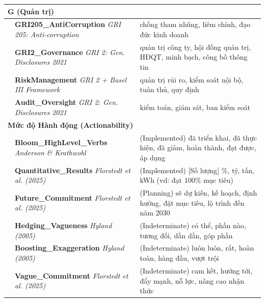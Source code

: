 \begin{longtable}{|p{2cm}|p{5cm}|p{7cm}|}
\multicolumn{3}{|l|}{\textbf{G (Quản trị)}} \\
\hline
\multirow{1}{*}{} & \textbf{GRI205\_AntiCorruption} \newline \textit{GRI 205: Anti-corruption} & chống tham nhũng, liêm chính, đạo đức kinh doanh \\
\hline
\multirow{1}{*}{} & \textbf{GRI2\_Governance} \newline \textit{GRI 2: Gen. Disclosures 2021} & quản trị công ty, hội đồng quản trị, HĐQT, minh bạch, công bố thông tin \\
\hline
\multirow{1}{*}{} & \textbf{RiskManagement} \newline \textit{GRI 2 + Basel III Framework} & quản trị rủi ro, kiểm soát nội bộ, tuân thủ, quy định \\
\hline
\multirow{1}{*}{} & \textbf{Audit\_Oversight} \newline \textit{GRI 2: Gen. Disclosures 2021} & kiểm toán, giám sát, ban kiểm soát \\
\hline

\multicolumn{3}{|l|}{\textbf{Mức độ Hành động (Actionability)}} \\
\hline
\multirow{1}{*}{} & \textbf{Bloom\_HighLevel\_Verbs} \newline \textit{Anderson \& Krathwohl \cite{anderson2001taxonomy}} & (Implemented) đã triển khai, đã thực hiện, đã giảm, hoàn thành, đạt được, áp dụng \\
\hline
\multirow{1}{*}{} & \textbf{Quantitative\_Results} \newline \textit{Florstedt et al. (2025) \cite{florstedt2025detecting}} & (Implemented) [Số lượng] \%, tỷ, tấn, kWh (vd: đạt 100\% mục tiêu) \\
\hline
\multirow{1}{*}{} & \textbf{Future\_Commitment} \newline \textit{Florstedt et al. (2025) \cite{florstedt2025detecting}} & (Planning) sẽ dự kiến, kế hoạch, định hướng, đặt mục tiêu, lộ trình đến năm 2030 \\
\hline
\multirow{1}{*}{} & \textbf{Hedging\_Vagueness} \newline \textit{Hyland (2005) \cite{rodina2007metadiscourse}} & (Indeterminate) có thể, phần nào, tương đối, dần dần, góp phần \\
\hline
\multirow{1}{*}{} & \textbf{Boosting\_Exaggeration} \newline \textit{Hyland (2005) \cite{rodina2007metadiscourse}} & (Indeterminate) luôn luôn, rất, hoàn toàn, hàng đầu, vượt trội \\
\hline
\multirow{1}{*}{} & \textbf{Vague\_Commitment} \newline \textit{Florstedt et al. (2025) \cite{florstedt2025detecting}} & (Indeterminate) cam kết, hướng tới, đẩy mạnh, nỗ lực, nâng cao nhận thức \\
\hline
\end{longtable}


